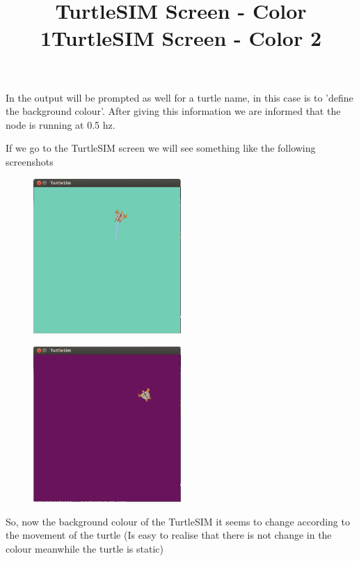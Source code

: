 \documentclass[a4paper,10pt,twoside]{book}
\begin{document}
				
				In the output will be prompted as well for a turtle name, in this case is to 'define the background colour'. 
				After giving this information we are informed that the node is running at 0.5 hz. 
				
				
				If we go to the TurtleSIM screen we will see something like the following screenshots
				
			\begin{figure}[!htbp]
  		
  				\centering
    				\includegraphics[width=0.5\textwidth]{TurtleSIMColor1.png}
				
				\centering
				\title{TurtleSIM Screen - Color 1} 
			\end{figure}
				
			\begin{figure}[!htbp]
  		
  				\centering
    				\includegraphics[width=0.5\textwidth]{TurtleSIMColor2.png}
				
				\centering
				\title{TurtleSIM Screen - Color 2}
			\end{figure}
				
				
	
				
			So, now the background colour of the TurtleSIM it seems to change according to the movement of the turtle (Is easy to realise that there is not change in the colour meanwhile the turtle is static) 
			
\end{document}
